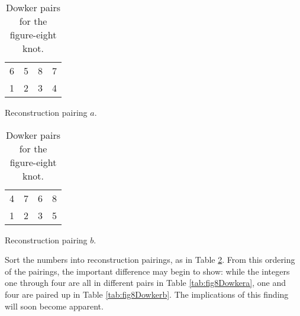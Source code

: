 \documentclass[titlepage]{article}
\begin{document}
\begin{table}[h!]
    \centering
    \begin{subtable}[b]{0.3\linewidth}
        \centering
        \begin{tabular}{cccc}
            6 & 5 & 8 & 7\\
            1 & 2 & 3 & 4
        \end{tabular}
        \caption{Reconstruction pairing $a$.}
        \label{tab:fig8Dowkera}
    \end{subtable}
    \begin{subtable}[b]{0.3\linewidth}
        \centering
        \begin{tabular}{cccc}
            4 & 7 & 6 & 8\\
            1 & 2 & 3 & 5
        \end{tabular}
        \caption{Reconstruction pairing $b$.}
        \label{tab:fig8Dowkerb}
    \end{subtable}
    \caption{Dowker pairs for the figure-eight knot.}
    \label{tab:fig8Dowker}
\end{table}

Sort the numbers into reconstruction pairings, as in Table \ref{tab:fig8Dowker}. From this ordering of the pairings, the important difference may begin to show: while the integers one through four are all in different pairs in Table \ref{tab:fig8Dowkera}, one and four are paired up in Table \ref{tab:fig8Dowkerb}. The implications of this finding will soon become apparent.\par
\end{document}
